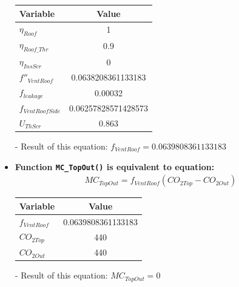 \documentclass[a4paper]{article}
\numberwithin{equation}{section}
\begin{document}
\begin{itemize}
        \begin{table}[H]
          \centering
          \begin{tabular}{@{}lS[table-format=1.17]@{}}
            \toprule
            \textbf{Variable}    & \textbf{Value}      \\
            \midrule
            \( \eta_{Roof} \)      & 1                   \\
            \( \eta_{Roof\_Thr} \) & 0.9                 \\
            \( \eta_{InsScr} \)    & 0                   \\
            \( f''_{VentRoof} \)   & 0.0638208361133183  \\
            \( f_{leakage} \)      & 0.00032             \\
            \( f_{VentRoofSide} \) & 0.06257828571428573 \\
            \( U_{ThScr} \)        & 0.863               \\
            \bottomrule
          \end{tabular}
        \end{table}

  \item[-] Result of this equation: \( f_{VentRoof} = 0.0639808361133183 \)

  \item \textbf{Function \texttt{MC\_TopOut()} is equivalent to equation:}
        \begin{align*}
          MC_{TopOut} = f_{VentRoof}(CO_{2 Top} - CO_{2 Out})
        \end{align*}

        \begin{table}[H]
          \centering
          \begin{tabular}{@{}lS@{}}
            \toprule
            \textbf{Variable} & \textbf{Value}     \\
            \midrule
            \( f_{VentRoof} \)  & 0.0639808361133183 \\
            \( CO_{2 Top} \)    & 440                \\
            \( CO_{2 Out} \)    & 440                \\
            \bottomrule
          \end{tabular}
        \end{table}

  \item[-] Result of this equation: \( MC_{TopOut} = 0 \)


\end{itemize}
\end{document}
